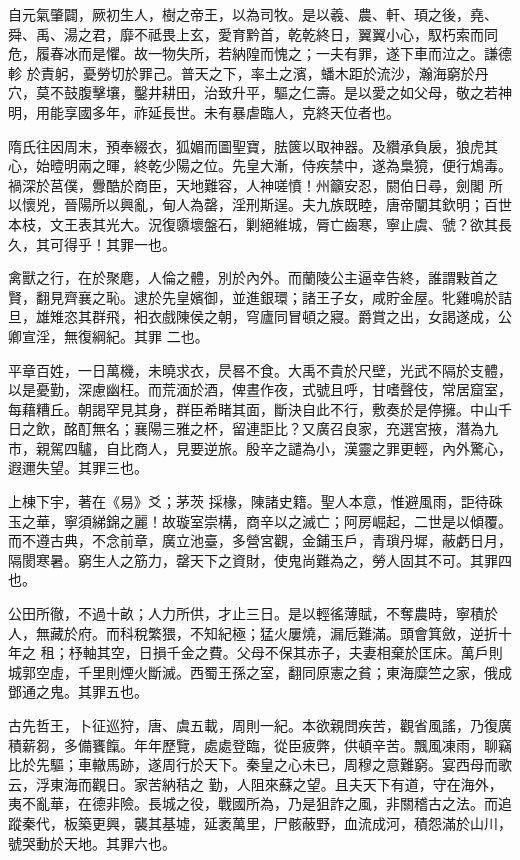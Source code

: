 \begin{pinyinscope}
 自元氣肇闢，厥初生人，樹之帝王，以為司牧。是以羲、農、軒、頊之後，堯、舜、禹、湯之君，靡不祗畏上玄，愛育黔首，乾乾終日，翼翼小心，馭朽索而同危，履春冰而是懼。故一物失所，若納隍而愧之；一夫有罪，遂下車而泣之。謙德軫
 於責躬，憂勞切於罪己。普天之下，率土之濱，蟠木距於流沙，瀚海窮於丹穴，莫不鼓腹擊壤，鑿井耕田，治致升平，驅之仁壽。是以愛之如父母，敬之若神明，用能享國多年，祚延長世。未有暴虐臨人，克終天位者也。



 隋氏往因周末，預奉綴衣，狐媚而圖聖寶，胠篋以取神器。及纘承負扆，狼虎其心，始曀明兩之暉，終乾少陽之位。先皇大漸，侍疾禁中，遂為梟獍，便行鴆毒。禍深於莒僕，釁酷於商臣，天地難容，人神嗟憤！州籲安忍，閼伯日尋，劍閣
 所以懷兇，晉陽所以興亂，甸人為罄，淫刑斯逞。夫九族既睦，唐帝闡其欽明；百世本枝，文王表其光大。況復隳壞盤石，剿絕維城，脣亡齒寒，寧止虞、虢？欲其長久，其可得乎！其罪一也。



 禽獸之行，在於聚麀，人倫之體，別於內外。而蘭陵公主逼幸告終，誰謂敤首之賢，翻見齊襄之恥。逮於先皇嬪御，並進銀環；諸王子女，咸貯金屋。牝雞鳴於詰旦，雄雉恣其群飛，衵衣戲陳侯之朝，穹廬同冒頓之寢。爵賞之出，女謁遂成，公卿宣淫，無復綱紀。其罪
 二也。



 平章百姓，一日萬機，未曉求衣，昃晷不食。大禹不貴於尺壁，光武不隔於支體，以是憂勤，深慮幽枉。而荒湎於酒，俾晝作夜，式號且呼，甘嗜聲伎，常居窟室，每藉糟丘。朝謁罕見其身，群臣希睹其面，斷決自此不行，敷奏於是停擁。中山千日之飲，酩酊無名；襄陽三雅之杯，留連詎比？又廣召良家，充選宮掖，潛為九市，親駕四驢，自比商人，見要逆旅。殷辛之譴為小，漢靈之罪更輕，內外驚心，遐邇失望。其罪三也。



 上棟下宇，著在《易》爻；茅茨
 採椽，陳諸史籍。聖人本意，惟避風雨，詎待硃玉之華，寧須綈錦之麗！故璇室崇構，商辛以之滅亡；阿房崛起，二世是以傾覆。而不遵古典，不念前章，廣立池臺，多營宮觀，金鋪玉戶，青瑣丹墀，蔽虧日月，隔閡寒暑。窮生人之筋力，罄天下之資財，使鬼尚難為之，勞人固其不可。其罪四也。



 公田所徹，不過十畝；人力所供，才止三日。是以輕徭薄賦，不奪農時，寧積於人，無藏於府。而科稅繁猥，不知紀極；猛火屢燒，漏卮難滿。頭會箕斂，逆折十年之
 租；杼軸其空，日損千金之費。父母不保其赤子，夫妻相棄於匡床。萬戶則城郭空虛，千里則煙火斷滅。西蜀王孫之室，翻同原憲之貧；東海糜竺之家，俄成鄧通之鬼。其罪五也。



 古先哲王，卜征巡狩，唐、虞五載，周則一紀。本欲親問疾苦，觀省風謠，乃復廣積薪芻，多備饔餼。年年歷覽，處處登臨，從臣疲弊，供頓辛苦。飄風凍雨，聊竊比於先驅；車轍馬跡，遂周行於天下。秦皇之心未已，周穆之意難窮。宴西母而歌云，浮東海而觀日。家苦納秸之
 勤，人阻來蘇之望。且夫天下有道，守在海外，夷不亂華，在德非險。長城之役，戰國所為，乃是狙詐之風，非關稽古之法。而追蹤秦代，板築更興，襲其基墟，延袤萬里，尸骸蔽野，血流成河，積怨滿於山川，號哭動於天地。其罪六也。




\end{pinyinscope}
